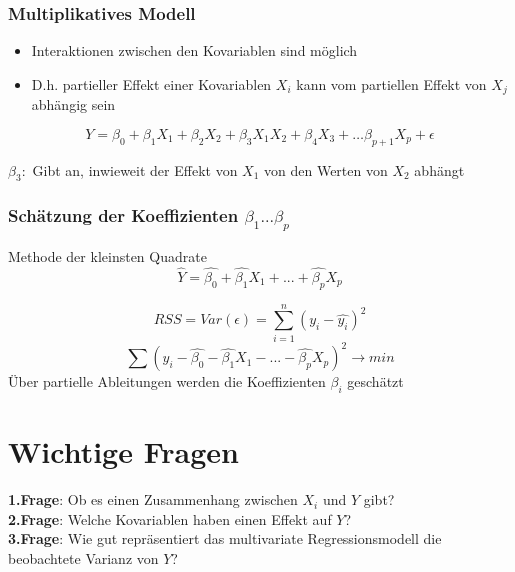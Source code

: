 \documentclass[10pt]{report}
\theoremstyle{definition}
\begin{document}
\subsubsection{Multiplikatives Modell}
\begin{itemize}
	\item Interaktionen zwischen den Kovariablen sind möglich
	\item D.h. partieller Effekt einer Kovariablen $X_i$ kann vom partiellen Effekt von $X_j$ abhängig sein
\end{itemize}
\[Y = \beta_0+ \beta_1X_1 + \beta_2X_2 + \beta_3 X_1X_2 + \beta_4 X_3 +\ldots \beta_{p+1}X_p + \epsilon\]

$\beta_3:$ Gibt an, inwieweit der Effekt von $X_1$ von den Werten von $X_2$ abhängt



\subsubsection{Schätzung der Koeffizienten $\beta_1 ... \beta_p$}
Methode der kleinsten Quadrate
\[\hat{Y} = \hat{\beta_0} + \hat{\beta_1} X_1 + ... + \hat{\beta_p} X_p \]

\[ RSS = Var(\epsilon)= \sum\limits_{i=1}^n (y_i - \hat{y_i} )^2 \]
\[ \sum (y_i - \hat{\beta_0} - \hat{\beta_1} X_1 - ... - \hat{\beta_p} X_p )^2 \rightarrow min \]
Über partielle Ableitungen werden die Koeffizienten $\beta_i$ geschätzt


\section{Wichtige Fragen}
\textbf{1.Frage}: Ob es einen Zusammenhang zwischen $X_i$ und $Y$ gibt? \\
\textbf{2.Frage}: Welche Kovariablen haben einen Effekt auf $Y$? \\
\textbf{3.Frage}: Wie gut repräsentiert das multivariate Regressionsmodell die beobachtete Varianz von $Y$?\\
\end{document}
